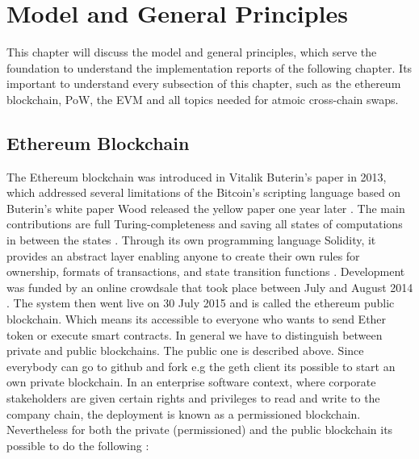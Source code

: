 \chapter{Model and General Principles}
\label{ch:background}

This chapter will discuss the model and general principles, which serve the foundation to understand the implementation reports of the following chapter. Its important to understand every subsection of this chapter, such as the ethereum blockchain, \ac{PoW}, the \ac{EVM} and all topics needed for atmoic cross-chain swaps. 


%
%
\section{Ethereum Blockchain}
\label{sec:background:first_section}
The Ethereum blockchain was introduced in Vitalik Buterin’s paper in 2013, which addressed several limitations of the Bitcoin’s scripting language \cite{buterin2013ethereum} based on Buterin's white paper Wood released the yellow paper one year later \cite{wood2014ethereum}. The main contributions are full Turing-completeness and saving all states of computations in between the states \cite{dannen2017introducing}.
Through its own programming language Solidity, it provides an abstract layer enabling anyone to create their own rules for ownership, formats of transactions, and state transition functions \cite{vujivcic2018blockchain}. Development was funded by an online crowdsale that took place between July and August 2014 \cite{tapscott2016blockchain}. The system then went live on 30 July 2015  and is called the ethereum public blockchain. Which means its accessible to everyone who wants to send Ether token or execute smart contracts. In general we have to distinguish between private and public blockchains. The public one is described above. Since everybody can go to github and fork e.g the geth client its possible to start an own private blockchain. In an enterprise software context, where corporate stakeholders are given certain rights and privileges to read and write to the company chain, the deployment is known as a permissioned blockchain. Nevertheless for both the private (permissioned) and the public blockchain its possible to do the following \cite{dannen2017introducing}:

